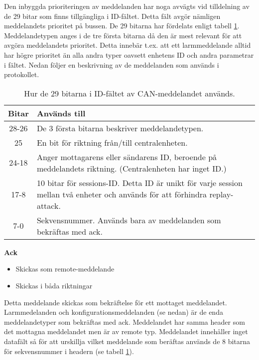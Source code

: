 Den inbyggda prioriteringen av meddelanden har noga avvägts vid tilldelning av de 29 bitar som finns tillgängliga i ID-fältet.
Detta fält avgör nämligen meddelandets prioritet på bussen.
De 29 bitarna har fördelats enligt tabell \ref{tab:idbitar}. Meddelandetypen anges i de tre första bitarna då den är mest relevant för att avgöra meddelandets prioritet. Detta innebär t.ex. att ett larmmeddelande alltid har högre prioritet än alla andra typer oavsett enhetens ID och andra parametrar i fältet. Nedan följer en beskrivning av de meddelanden som används i protokollet.

\begin{table}[H]
	\centering
	\begin{tabular}{|c|p{}|}
		\hline
		Bitar 	& Används till \\ \hline \hline
		28-26		& De 3 första bitarna beskriver meddelandetypen. \\ \hline
		25		& En bit för riktning från/till centralenheten. \\ \hline
		24-18	& Anger mottagarens eller sändarens ID, beroende på meddelandets riktning. (Centralenheten har inget ID.) \\ \hline
		17-8 & 10 bitar för sessions-ID. Detta ID är unikt för varje session mellan två enheter och används för att förhindra replay-attack. \\ \hline
		7-0 & Sekvensnummer. Används bara av meddelanden som bekräftas med ack. \\ \hline

	\end{tabular}
	\caption{Hur de 29 bitarna i ID-fältet av CAN-meddelandet används.}
	\label{tab:idbitar}
\end{table}


\textbf{Ack}
\begin{itemize}
    \item Skickas som remote-meddelande
    \item Skickas i båda riktningar
\end{itemize}
Detta meddelande skickas som bekräftelse för ett mottaget meddelandet. Larmmedelanden och konfigurationsmeddelanden (se nedan) är de enda meddelandetyper som bekräftas med ack. Meddelandet har samma header som det mottagna meddelandet men är av remote typ. Meddelandet innehåller inget datafält så för att urskillja vilket meddelande som beräftas används de 8 bitarna för sekvensnummer i headern (se tabell \ref{tab:idbitar}). \\


